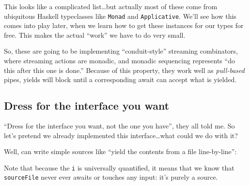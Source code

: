 \documentclass[]{article}
\newenvironment{Shaded}{}{}
\newcommand{\CommentTok}[1]{\textcolor[rgb]{0.38,0.63,0.69}{\textit{#1}}}
\newcommand{\DataTypeTok}[1]{\textcolor[rgb]{0.56,0.13,0.00}{#1}}
\newcommand{\FunctionTok}[1]{\textcolor[rgb]{0.02,0.16,0.49}{#1}}
\newcommand{\KeywordTok}[1]{\textcolor[rgb]{0.00,0.44,0.13}{\textbf{#1}}}
\newcommand{\NormalTok}[1]{#1}
\newcommand{\OperatorTok}[1]{\textcolor[rgb]{0.40,0.40,0.40}{#1}}
\newcommand{\OtherTok}[1]{\textcolor[rgb]{0.00,0.44,0.13}{#1}}
\begin{document}
This looks like a complicated list\ldots but actually most of these come from
ubiquitous Haskell typeclasses like \texttt{Monad} and \texttt{Applicative}.
We'll see how this comes into play later, when we learn how to get these
instances for our types for free. This makes the actual ``work'' we have to do
very small.

So, these are going to be implementing ``conduit-style'' streaming combinators,
where streaming actions are monadic, and monadic sequencing represents ``do this
after this one is done.'' Because of this property, they work well as
\emph{pull-based} pipes, yields will block until a corresponding await can
accept what is yielded.

\hypertarget{dress-for-the-interface-you-want}{%
\subsection{Dress for the interface you
want}\label{dress-for-the-interface-you-want}}

``Dress for the interface you want, not the one you have'', they all told me. So
let's pretend we already implemented this interface\ldots what could we do with
it?

Well, can write simple sources like ``yield the contents from a file
line-by-line'':

\begin{Shaded}
\end{Shaded}

Note that because the \texttt{i} is universally quantified, it means that we
know that \texttt{sourceFile} never ever awaits or touches any input: it's
purely a source.
\end{document}
